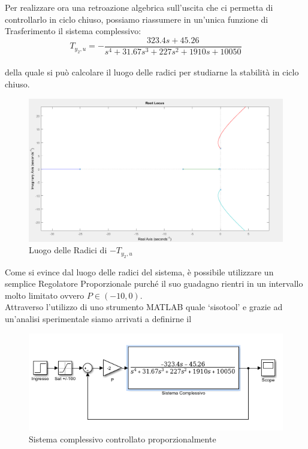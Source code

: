Per realizzare ora una retroazione algebrica sull'uscita che ci permetta di controllarlo in ciclo chiuso, possiamo riassumere in un'unica funzione di Trasferimento il sistema complessivo:\\
$$T_{y_2,u}=-\displaystyle\frac{323.4s+45.26}{s^4+31.67s^3+227s^2+1910s+10050}$$\\
della quale si può calcolare il luogo delle radici per studiarne la stabilità in ciclo chiuso.
\begin{figure}[ht]
	\centering
	\includegraphics[width=\textwidth]{RLocusPendoloNormale.PNG}
	\caption{Luogo delle Radici di $-T_{y_2,u}$}
	\label{RLocusPendoloNormale}
\end{figure}
Come si evince dal luogo delle radici del sistema, è possibile utilizzare un semplice Regolatore Proporzionale purché il suo guadagno rientri in un intervallo molto limitato ovvero $P\in(-10,0)$.\\
Attraverso l'utilizzo di uno strumento MATLAB quale `sisotool' e grazie ad un'analisi sperimentale siamo arrivati a definirne il 
\begin{figure}[ht]
	\centering
	\includegraphics[width=\textwidth]{SisComplessivoPNRetroazionato.PNG}
	\caption{Sistema complessivo controllato proporzionalmente}
	\label{SisComplessivoPNRetroazionato}
\end{figure}
